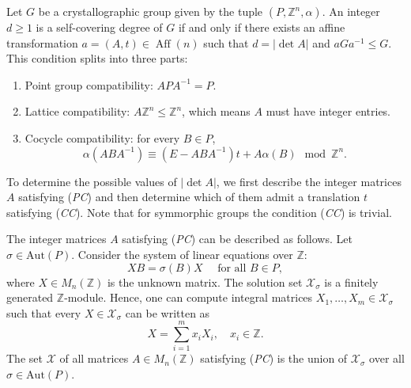 \documentclass[draft]{adm-paper}
\theoremstyle{definition}
\begin{document}


Let $G$ be a crystallographic group given by the tuple $(P,\mathbb{Z}^n,\alpha)$.
An integer $d\geq 1$ is a self-covering degree of $G$ if and only if there exists an affine transformation
$a=(A,t)\in \operatorname{Aff}(n)$ such that $d=|\det A|$ and $aGa^{-1}\leq G$. This condition splits into three parts:
\begin{enumerate}
  \item[(\textit{PC})] Point group compatibility: $APA^{-1}=P$.
  \item[(\textit{LC})] Lattice compatibility: $A\mathbb{Z}^n\leq \mathbb{Z}^n$, which means $A$ must have integer entries.
  \item[(\textit{CC})] Cocycle compatibility: for every $B\in P$,
\[
\alpha(ABA^{-1})\equiv(E-ABA^{-1})t+A\alpha(B)  \mod \mathbb{Z}^n.
\]
\end{enumerate}
To determine the possible values of $|\det A|$, we first describe the integer matrices $A$ satisfying (\textit{PC})
and then determine which of them admit a translation $t$ satisfying (\textit{CC}). Note that for symmorphic groups
the condition (\textit{CC}) is trivial.

The integer matrices $A$ satisfying (\textit{PC}) can be described as follows.
Let $\sigma \in \mathrm{Aut}(P)$.
Consider the system of linear equations over $\mathbb{Z}$:
\[
X B = \sigma(B) X \quad \mbox{ for all $B \in P$},
\]
where $X \in M_{n}(\mathbb{Z})$ is the unknown matrix. The solution set $\mathcal{X}_\sigma$ is a finitely generated
$\mathbb{Z}$-module. Hence, one can compute integral matrices $X_1, \dots, X_m \in \mathcal{X}_\sigma$ such that every
$X \in \mathcal{X}_\sigma$ can be written as
\begin{equation}\label{eqn:X_sum_Xi}
  X = \sum_{i=1}^{m} x_i X_i, \quad
  x_i \in \mathbb{Z}.
\end{equation}
The set $\mathcal{X}$ of all matrices $A\in M_{n}(\mathbb{Z})$ satisfying (\textit{PC}) is the union of
$\mathcal{X}_\sigma$ over all $\sigma \in \mathrm{Aut}(P)$.
\end{document}
